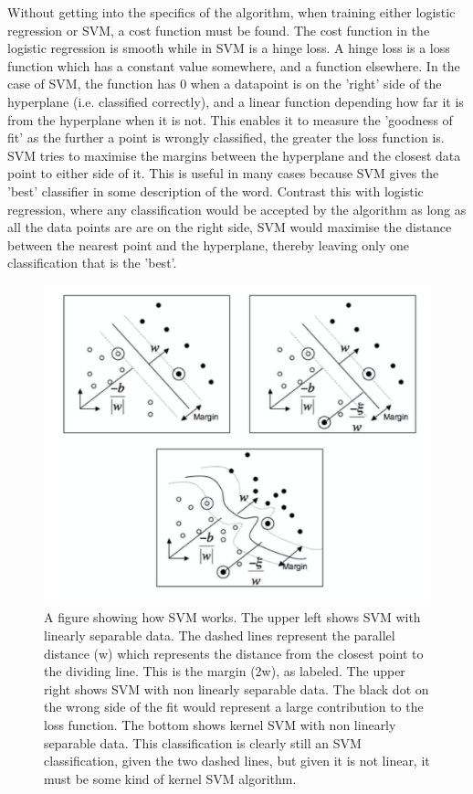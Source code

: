 \documentclass[a4paper,11pt]{article}
\begin{document}
Without getting into the specifics of the algorithm, when training either logistic regression or SVM, a cost function must be found. The cost function in the logistic regression is smooth while in SVM is a hinge loss. A hinge loss is a loss function which has a constant value somewhere, and a function elsewhere. In the case of SVM, the function has 0 when a datapoint is on the 'right' side of the hyperplane (i.e. classified correctly), and a linear function depending how far it is from the hyperplane when it is not. This enables it to measure the 'goodness of fit' as the further a point is wrongly classified, the greater the loss function is. SVM tries to maximise the margins between the hyperplane and the closest data point to either side of it. This is useful in many cases because SVM gives the 'best' classifier in some description of the word. Contrast this with logistic regression, where any classification would be accepted by the algorithm as long as all the data points are are on the right side, SVM would maximise the distance between the nearest point and the hyperplane, thereby leaving only one classification that is the 'best'. 
\begin{figure}[ht]
\centering
\includegraphics[width=\textwidth]{SVM.png}
\caption{\label{fig:SVM}A figure showing how SVM works. The upper left shows SVM with linearly separable data. The dashed lines represent the parallel distance (w) which represents the distance from the closest point to the dividing line. This is the margin (2w), as labeled. The upper right shows SVM with non linearly separable data. The black dot on the wrong side of the fit would represent a large contribution to the loss function. The bottom shows kernel SVM with non linearly separable data. This classification is clearly still an SVM classification, given the two dashed lines, but given it is not linear, it must be some kind of kernel SVM algorithm. \cite{huertascompany_2010_revisiting}}
\end{figure}
\end{document}
